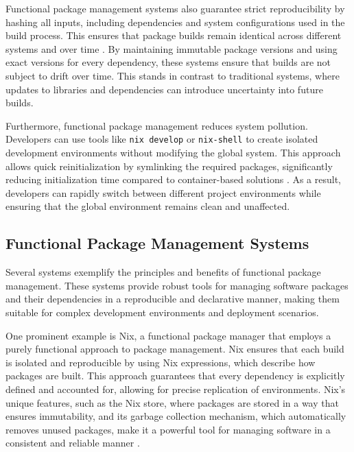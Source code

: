 Functional package management systems also guarantee strict reproducibility by
hashing all inputs, including dependencies and system configurations used in the
build process. This ensures that package builds remain identical across different
systems and over time \cite[Section 2.2]{courtesFunctionalPackageManagement2013}.
By maintaining immutable package versions and using exact versions for every dependency,
these systems ensure that builds are not subject to drift over time.
This stands in contrast to traditional systems,
where updates to libraries and dependencies can introduce uncertainty into
future builds.

Furthermore, functional package management reduces system pollution. Developers can
use tools like \texttt{nix develop} or \texttt{nix-shell} to create isolated development
environments without modifying the global system. This approach allows quick
reinitialization by symlinking the required packages, significantly reducing
initialization time compared to container-based solutions
\cite{NixDevelopNix, NixshellNixReference}. As a result, developers can rapidly
switch between different project environments while ensuring that the global
environment remains clean and unaffected.

\subsection{Functional Package Management Systems}

Several systems exemplify the principles and benefits of functional package management.
These systems provide robust tools for managing software packages and their dependencies
in a reproducible and declarative manner, making them suitable for complex development
environments and deployment scenarios.

One prominent example is Nix, a functional package manager that employs a purely
functional approach to package management. Nix ensures that each build is isolated
and reproducible by using Nix expressions, which describe how packages are built.
This approach guarantees that every dependency is explicitly defined and accounted for,
allowing for precise replication of environments. Nix's unique features, such as the
Nix store, where packages are stored in a way that ensures immutability, and its garbage
collection mechanism, which automatically removes unused packages, make it a powerful
tool for managing software in a consistent and reliable manner
\cite[Section 2.2]{courtesFunctionalPackageManagement2013}.

